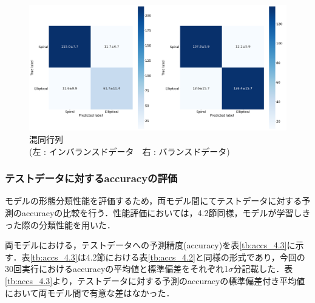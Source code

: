 \documentclass[a4j, 11pt]{jreport}
\begin{document}
\begin{figure}[H]
  \centering
  \includegraphics[width=1\hsize, keepaspectratio]{images/drawio/4_3_cms.png}
  \caption{混同行列\\(左 : インバランスドデータ　右 : バランスドデータ)}
  \label{fig:4_3_cms}
\end{figure}




\subsubsection{テストデータに対するaccuracyの評価}
モデルの形態分類性能を評価するため，両モデル間にてテストデータに対する予測のaccuracyの比較を行う．性能評価においては，4.2節同様，モデルが学習しきった際の分類性能を用いた．

両モデルにおける，テストデータへの予測精度(accuracy)を表\ref{tb:accs_4.3}に示す．表\ref{tb:accs_4.3}は4.2節における表\ref{tb:accs_4.2}と同様の形式であり，今回の30回実行におけるaccuracyの平均値と標準偏差をそれぞれ1$\sigma$分記載した．表\ref{tb:accs_4.3}より，テストデータに対する予測のaccuracyの標準偏差付き平均値において両モデル間で有意な差はなかった．
\end{document}
